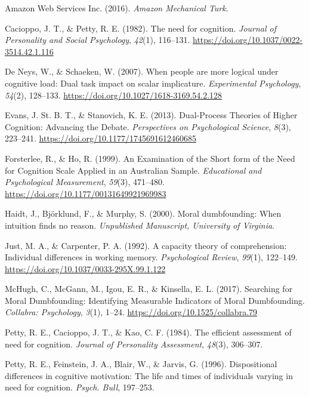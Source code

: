 \documentclass[
  man,floatsintext]{apa6}
\newlength{\cslhangindent}
\newlength{\cslentryspacingunit} %
\newenvironment{CSLReferences}[2] %
 {%
  \setlength{\parindent}{0pt}
  \ifodd #1
  \let\oldpar\par
  \def\par{\hangindent=\cslhangindent\oldpar}
  \fi
  \setlength{\parskip}{#2\cslentryspacingunit}
 }%
 {}
\begin{document}
\hypertarget{refs}{}
\begin{CSLReferences}{1}{0}
\leavevmode{}%
Amazon Web Services Inc. (2016). \emph{Amazon {Mechanical Turk}}.

\leavevmode{}%
Cacioppo, J. T., \& Petty, R. E. (1982). The need for cognition. \emph{Journal of Personality and Social Psychology}, \emph{42}(1), 116--131. \url{https://doi.org/10.1037/0022-3514.42.1.116}

\leavevmode{}%
De Neys, W., \& Schaeken, W. (2007). When people are more logical under cognitive load: {Dual} task impact on scalar implicature. \emph{Experimental Psychology}, \emph{54}(2), 128--133. \url{https://doi.org/10.1027/1618-3169.54.2.128}

\leavevmode{}%
Evans, J. St. B. T., \& Stanovich, K. E. (2013). Dual-{Process Theories} of {Higher Cognition}: {Advancing} the {Debate}. \emph{Perspectives on Psychological Science}, \emph{8}(3), 223--241. \url{https://doi.org/10.1177/1745691612460685}

\leavevmode{}%
Forsterlee, R., \& Ho, R. (1999). An {Examination} of the {Short} form of the {Need} for {Cognition Scale Applied} in an {Australian Sample}. \emph{Educational and Psychological Measurement}, \emph{59}(3), 471--480. \url{https://doi.org/10.1177/00131649921969983}

\leavevmode{}%
Haidt, J., Björklund, F., \& Murphy, S. (2000). Moral dumbfounding: {When} intuition finds no reason. \emph{Unpublished Manuscript, University of Virginia}.

\leavevmode{}%
Just, M. A., \& Carpenter, P. A. (1992). A capacity theory of comprehension: {Individual} differences in working memory. \emph{Psychological Review}, \emph{99}(1), 122--149. \url{https://doi.org/10.1037/0033-295X.99.1.122}

\leavevmode{}%
McHugh, C., McGann, M., Igou, E. R., \& Kinsella, E. L. (2017). Searching for {Moral Dumbfounding}: {Identifying Measurable Indicators} of {Moral Dumbfounding}. \emph{Collabra: Psychology}, \emph{3}(1), 1--24. \url{https://doi.org/10.1525/collabra.79}

\leavevmode{}%
Petty, R. E., Cacioppo, J. T., \& Kao, C. F. (1984). The efficient assessment of need for cognition. \emph{Journal of Personality Assessment}, \emph{48}(3), 306--307.

\leavevmode{}%
Petty, R. E., Feinstein, J. A., Blair, W., \& Jarvis, G. (1996). Dispositional differences in cognitive motivation: {The} life and times of individuals varying in need for cognition. \emph{Psych. Bull}, 197--253.

\end{CSLReferences}
\end{document}

